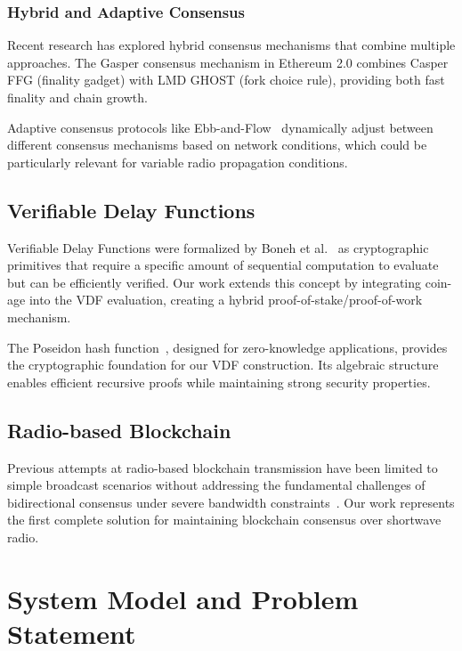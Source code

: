 \documentclass[11pt,a4paper]{article}
\begin{document}
\subsubsection{Hybrid and Adaptive Consensus}

Recent research has explored hybrid consensus mechanisms that combine multiple approaches. The Gasper consensus mechanism in Ethereum 2.0 combines Casper FFG (finality gadget) with LMD GHOST (fork choice rule), providing both fast finality and chain growth.

Adaptive consensus protocols like Ebb-and-Flow~\cite{kelkar2020ebb} dynamically adjust between different consensus mechanisms based on network conditions, which could be particularly relevant for variable radio propagation conditions.

\subsection{Verifiable Delay Functions}

Verifiable Delay Functions were formalized by Boneh et al.~\cite{boneh2018verifiable} as cryptographic primitives that require a specific amount of sequential computation to evaluate but can be efficiently verified. Our work extends this concept by integrating coin-age into the VDF evaluation, creating a hybrid proof-of-stake/proof-of-work mechanism.

The Poseidon hash function~\cite{grassi2021poseidon}, designed for zero-knowledge applications, provides the cryptographic foundation for our VDF construction. Its algebraic structure enables efficient recursive proofs while maintaining strong security properties.

\subsection{Radio-based Blockchain}

Previous attempts at radio-based blockchain transmission have been limited to simple broadcast scenarios without addressing the fundamental challenges of bidirectional consensus under severe bandwidth constraints~\cite{radio_bitcoin}. Our work represents the first complete solution for maintaining blockchain consensus over shortwave radio.

\section{System Model and Problem Statement}
\end{document}
